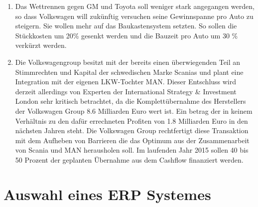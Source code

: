 \documentclass[12pt]{article}
\begin{document}
\begin{enumerate}
\item Das Wettrennen gegen GM und Toyota soll weniger stark angegangen werden, so dass Volkswagen will zukünftig versuchen seine Gewinnspanne pro Auto zu steigern. Sie wollen mehr auf das Baukastensystem setzten. So sollen die Stückkosten um 20\% gesenkt werden und die Bauzeit pro Auto um 30 \% verkürzt werden. \cite{vwamstrategie}
\item Die Volkswagengroup besitzt mit der bereits einen überwiegenden Teil an Stimmrechten und Kapital der schwedischen Marke Scanias und plant eine Integration mit der eigenen LKW-Tochter MAN. Dieser Entschluss wird derzeit allerdings von Experten der International Strategy \& Investment London sehr kritisch betrachtet, da die Komplettübernahme des Herstellers der Volkswagen Group 8.6 Milliarden Euro wert ist. Ein betrag der in keinem Verhältnis zu den dafür errechneten Profiten von 1.8 Milliarden Euro in den nächsten Jahren steht. Die Volkswagen Group rechtfertigt diese Transaktion mit dem Aufheben von Barrieren die das Optimum aus der Zusammenarbeit von Scania und MAN herausholen soll.
Im laufenden Jahr 2015 sollen 40 bis 50 Prozent der geplanten Übernahme aus dem Cashflow finanziert werden. \cite{ScaniaMAN}
\end{enumerate}
\newpage
\section{Auswahl eines ERP Systemes}
\end{document}

